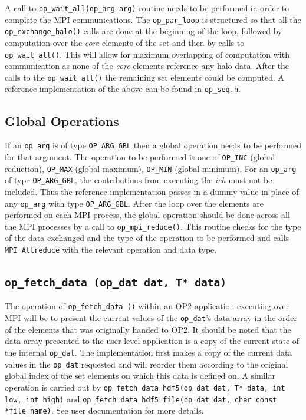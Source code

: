 \documentclass[11pt]{article}
\begin{document}
\noindent A call to \texttt{op\_wait\_all(op\_arg arg)} routine needs to be performed in order to complete the MPI
communications. The \texttt{op\_par\_loop} is structured so that all the \texttt{op\_exchange\_halo()} calls are done at
the beginning of the loop, followed by computation over the \textit{core} elements of the set and then by calls to
\texttt{op\_wait\_all()}. This will allow for maximum overlapping of computation with communication as none of the
\textit{core} elements reference any halo data. After the calls to the \texttt{op\_wait\_all()} the remaining set
elements could be computed. A reference implementation of the above can be found in \texttt{op\_seq.h}.

\subsection{Global Operations}\label{subsec/globalops}

If an \texttt{op\_arg} is of type \texttt{OP\_ARG\_GBL} then a global operation needs to be performed for that argument.
The operation to be performed is one of \texttt{OP\_INC} (global reduction), \texttt{OP\_MAX} (global maximum),
\texttt{OP\_MIN} (global minimum). For an \texttt{op\_arg} of type \texttt{OP\_ARG\_GBL}, the contributions from
executing the \textit{ieh} must not be included. Thus the reference implementation passes in a dummy value in place of
any \texttt{op\_arg} with type \texttt{OP\_ARG\_GBL}. After the loop over the elements are performed on each MPI
process, the global operation should be done across all the MPI processes by a call to \texttt{op\_mpi\_reduce()}. This
routine checks for the type of the data exchanged and the type of the operation to be performed and calls
\texttt{MPI\_Allreduce} with the relevant operation and data type.

\subsection{\texttt{op\_fetch\_data (op\_dat dat, T* data)}}\label{subsec/putfetch}
The operation of \texttt{op\_fetch\_data ()} within an OP2 application executing over MPI will be to present the current
values of the \texttt{op\_dat}'s data array in the order of the elements that was originally handed to OP2. It should be
noted that the data array presented to the user level application is a \underline{copy} of the current state of the
internal \texttt{op\_dat}. The implementation first makes a copy of the current data values in the \texttt{op\_dat}
requested and will reorder them according to the original global index of the set elements on which this data is defined
on. A similar operation is carried out by \texttt{op\_fetch\_data\_hdf5(op\_dat dat, T* data, int low, int high)} and
\texttt{op\_fetch\_data\_hdf5\_file(op\_dat dat, char const *file\_name)}. See user documentation for more details.
\end{document}
